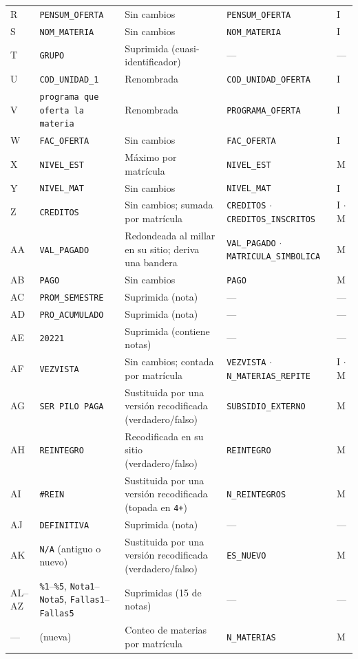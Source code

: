 \documentclass[11pt,a4paper,twoside,twocolumn]{article}
\newcommand{\cod}[1]{\nolinkurl{#1}}
\begin{document}
{\begin{xltabular}{\textwidth}{@{}l P{4.6cm} L P{4.1cm} l@{}}
R & \cod{PENSUM_OFERTA} & Sin cambios & \cod{PENSUM_OFERTA} & I \\
S & \cod{NOM_MATERIA} & Sin cambios & \cod{NOM_MATERIA} & I \\
T & \cod{GRUPO} & Suprimida (cuasi-identificador) & --- & --- \\
U & \cod{COD_UNIDAD_1} & Renombrada & \cod{COD_UNIDAD_OFERTA} & I \\
V & \texttt{programa que oferta la materia} & Renombrada & \cod{PROGRAMA_OFERTA} & I \\
W & \cod{FAC_OFERTA} & Sin cambios & \cod{FAC_OFERTA} & I \\
X & \cod{NIVEL_EST} & Máximo por matrícula & \cod{NIVEL_EST} & M \\
Y & \cod{NIVEL_MAT} & Sin cambios & \cod{NIVEL_MAT} & I \\
Z & \cod{CREDITOS} & Sin cambios; sumada por matrícula & \cod{CREDITOS} $\cdot$ \cod{CREDITOS_INSCRITOS} & I $\cdot$ M \\
AA & \cod{VAL_PAGADO} & Redondeada al millar en su sitio; deriva una bandera & \cod{VAL_PAGADO} $\cdot$ \cod{MATRICULA_SIMBOLICA} & M \\
AB & \cod{PAGO} & Sin cambios & \cod{PAGO} & M \\
AC & \cod{PROM_SEMESTRE} & Suprimida (nota) & --- & --- \\
AD & \cod{PRO_ACUMULADO} & Suprimida (nota) & --- & --- \\
AE & \cod{20221} & Suprimida (contiene notas) & --- & --- \\
AF & \cod{VEZVISTA} & Sin cambios; contada por matrícula & \cod{VEZVISTA} $\cdot$ \cod{N_MATERIAS_REPITE} & I $\cdot$ M \\
AG & \texttt{SER PILO PAGA} & Sustituida por una versión recodificada (verdadero/falso) & \cod{SUBSIDIO_EXTERNO} & M \\
AH & \cod{REINTEGRO} & Recodificada en su sitio (verdadero/falso) & \cod{REINTEGRO} & M \\
AI & \texttt{\#REIN} & Sustituida por una versión recodificada (topada en \cod{4+}) & \cod{N_REINTEGROS} & M \\
AJ & \cod{DEFINITIVA} & Suprimida (nota) & --- & --- \\
AK & \cod{N/A} (antiguo o nuevo) & Sustituida por una versión recodificada (verdadero/falso) & \cod{ES_NUEVO} & M \\
AL--AZ & \texttt{\%1}--\texttt{\%5}, \cod{Nota1}--\cod{Nota5}, \cod{Fallas1}--\cod{Fallas5} & Suprimidas (15 de notas) & --- & --- \\
--- & (nueva) & Conteo de materias por matrícula & \cod{N_MATERIAS} & M \\
\end{xltabular}
}
\end{document}
